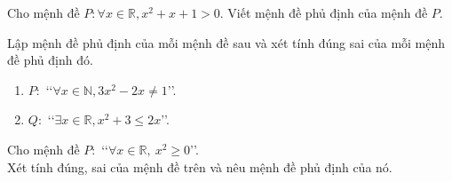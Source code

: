 \begin{bt}%
	Cho mệnh đề $P:\forall x\in\mathbb{R},x^2+x+1>0$. Viết mệnh đề phủ định của mệnh đề $P$.
\end{bt}

\begin{bt}%
	Lập mệnh đề phủ định của mỗi mệnh đề sau và xét tính đúng sai của mỗi mệnh đề phủ định đó.
	\begin{enumerate}
		\item $ P\colon$ \lq\lq $\forall x\in\mathbb{N}, 3x^2-2x\neq 1$\rq\rq. 
		\item $ Q\colon$ \lq\lq $\exists x\in\mathbb{R}, x^2+3\leq 2x$\rq\rq.
	\end{enumerate}
\end{bt}

\begin{bt}%
   Cho mệnh đề $P\colon$ \lq\lq $ \forall x\in\mathbb{R},\ x^2\geq 0 $\rq\rq . \\
   	Xét tính đúng, sai của mệnh đề trên và nêu mệnh đề phủ định của nó.
\end{bt}

